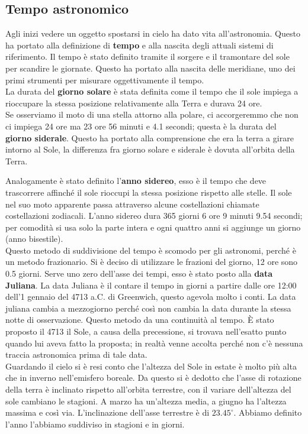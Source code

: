 \documentclass[a4paper,11pt]{article}
\begin{document}
\subsection{Tempo astronomico}
Agli inizi vedere un oggetto spostarsi in cielo ha dato vita all'astronomia. Questo ha portato alla definizione di \textbf{tempo} e alla nascita degli attuali sistemi di riferimento. Il tempo è stato definito tramite il sorgere e il tramontare del sole per scandire le giornate. Questo ha portato alla nascita delle meridiane, uno dei primi strumenti per misurare oggettivamente il tempo.\\
La durata del \textbf{giorno solare} è stata definita come il tempo che il sole impiega a rioccupare la stessa posizione relativamente alla Terra e durava 24 ore.\\
Se osserviamo il moto di una stella attorno alla polare, ci accorgeremmo che non ci impiega 24 ore ma 23 ore 56 minuti e  4.1 secondi; questa è la durata del \textbf{giorno siderale}.
Questo ha portato alla comprensione che era la terra a girare intorno al Sole, la differenza fra giorno solare e siderale è dovuta all'orbita della Terra.
\begin{figure}[ht]
    \centering
\end{figure}
Analogamente è stato definito l'\textbf{anno sidereo}, esso è il tempo che deve trascorrere affinché il sole rioccupi la stessa posizione rispetto alle stelle. Il sole nel suo moto apparente passa attraverso alcune costellazioni chiamate costellazioni zodiacali. L'anno sidereo dura 365 giorni 6 ore 9 minuti 9.54 secondi; per comodità si usa solo la parte intera e ogni quattro anni si aggiunge un giorno (anno bisestile).\\
Questo metodo di suddivisione del tempo è scomodo per gli astronomi, perché è un metodo frazionario. Si è deciso di utilizzare le frazioni del giorno, 12 ore sono 0.5 giorni. Serve uno zero dell'asse dei tempi, esso è stato posto alla \textbf{data Juliana}. La data Juliana è il contare il tempo in giorni a partire dalle ore 12:00 dell'1 gennaio del 4713 a.C. di Greenwich, questo agevola molto i conti. La data juliana cambia a mezzogiorno perché così non cambia la data durante la stessa notte di osservazione. Questo metodo da una continuità al tempo. È stato proposto il 4713 il Sole, a causa della precessione, si trovava nell'esatto punto quando lui aveva fatto la proposta; in realtà venne accolta perché non c'è nessuna traccia astronomica prima di tale data. \\
Guardando il cielo si è resi conto che l'altezza del Sole in estate è molto più alta che in inverno nell'emisfero boreale. Da questo si è dedotto che l'asse di rotazione della terra è inclinato rispetto all'orbita terrestre, con il variare dell'altezza del sole cambiano le stagioni. A marzo ha un'altezza media, a giugno ha l'altezza massima e così via.
L'inclinazione dell'asse terrestre è di $23.45^\circ$. Abbiamo definito l'anno l'abbiamo suddiviso in stagioni e in giorni.
\end{document}
